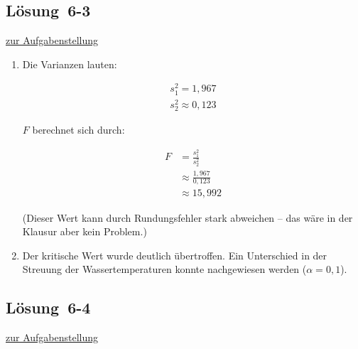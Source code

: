 \documentclass[
  11pt,
  ngerman,
  a4paper,
]{report}
\begin{document}
\hypertarget{loesung-6-3}{%
\subsection{Lösung~6-3}\label{loesung-6-3}}

\protect\hyperlink{aufgabe-6-3}{zur Aufgabenstellung}

\begin{enumerate}
\def\labelenumi{\alph{enumi})}
\item
  Die Varianzen lauten:

  \[\begin{aligned}
   s^2_1= 1{,}967\\
   s^2_2\approx 0{,}123
   \end{aligned}\]

  \(F\) berechnet sich durch:

  \[\begin{aligned}
   F&=\frac{s^2_1}{s^2_2}\\[6pt]
   &\approx\frac{1{,}967}{0{,}123}\\[4pt]
   &\approx15{,}992
   \end{aligned}\]

  (Dieser Wert kann durch Rundungsfehler stark abweichen -- das wäre in der Klausur aber kein Problem.)
\item
  Der kritische Wert wurde deutlich übertroffen. Ein Unterschied in der Streuung der Wassertemperaturen konnte nachgewiesen werden (\(\alpha=0{,}1\)).
\end{enumerate}

\hypertarget{loesung-6-4}{%
\subsection{Lösung~6-4}\label{loesung-6-4}}

\protect\hyperlink{aufgabe-6-4}{zur Aufgabenstellung}
\end{document}
